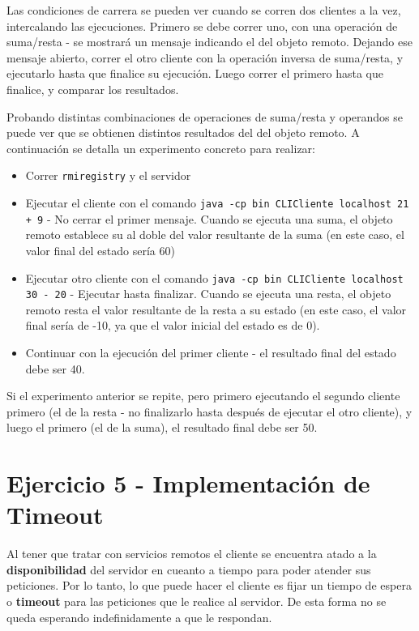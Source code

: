 Las condiciones de carrera se pueden ver cuando se corren dos clientes a la vez, intercalando las ejecuciones. Primero se debe correr uno, con una operación de suma/resta - se mostrará un mensaje indicando el  del objeto remoto. Dejando ese mensaje abierto, correr el otro cliente con la operación inversa de suma/resta, y ejecutarlo hasta que finalice su ejecución. Luego correr el primero hasta que finalice, y comparar los resultados.

Probando distintas combinaciones de operaciones de suma/resta y operandos se puede ver que se obtienen distintos resultados del  del objeto remoto. A continuación se detalla un experimento concreto para realizar:

\begin{itemize}
    \item Correr \texttt{rmiregistry} y el servidor 
    \item Ejecutar el cliente con el comando \texttt{java -cp bin CLICliente localhost 21 + 9} - No cerrar el primer mensaje. Cuando se ejecuta una suma, el objeto remoto establece su  al doble del valor resultante de la suma (en este caso, el valor final del estado sería 60)
    \item Ejecutar otro cliente con el comando \texttt{java -cp bin CLICliente localhost 30 - 20} - Ejecutar hasta finalizar. Cuando se ejecuta una resta, el objeto remoto resta el valor resultante de la resta a su estado (en este caso, el valor final sería de -10, ya que el valor inicial del estado es de 0).
    \item Continuar con la ejecución del primer cliente - el resultado final del estado debe ser 40.
\end{itemize}

Si el experimento anterior se repite, pero primero ejecutando el segundo cliente primero (el de la resta - no finalizarlo hasta después de ejecutar el otro cliente), y luego el primero (el de la suma), el resultado final debe ser 50.


\section{Ejercicio 5 - Implementación de Timeout}

Al tener que tratar con servicios remotos el cliente se encuentra atado a la \textbf{disponibilidad} del servidor en cueanto a tiempo para poder atender sus peticiones. Por lo tanto, lo que puede hacer el cliente es fijar un tiempo de espera o \textbf{timeout} para las peticiones que le realice al servidor. De esta forma no se queda esperando indefinidamente a que le respondan.

